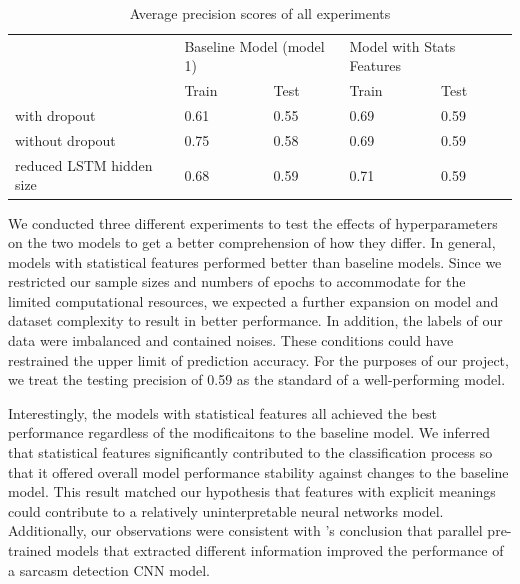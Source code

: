 \documentclass[12pt]{diazessay} %
\begin{document}
\begin{table}[h!]
    \centering
    \begin{tabular}{|l|l|l|l|l|}
    \hline
    \multirow{2}{*}{}        & \multicolumn{2}{l|}{Baseline Model (model 1)} & \multicolumn{2}{l|}{Model with Stats Features} \\ \cline{2-5} 
                             & Train                  & Test                 & Train                  & Test                  \\ \hline
    with dropout             & 0.61                   & 0.55                 & 0.69                   & 0.59                  \\ \hline
    without dropout          & 0.75                   & 0.58                 & 0.69                   & 0.59                  \\ \hline
    reduced LSTM hidden size & 0.68                   & 0.59                 & 0.71                   & 0.59                  \\ \hline
    \end{tabular}
    \caption{Average precision scores of all experiments}
    \label{table:AP}
\end{table}

We conducted three different experiments to test the effects of hyperparameters on the two models to get a better comprehension of how they differ. In general, models with statistical features performed better than baseline models. Since we restricted our sample sizes and numbers of epochs to accommodate for the limited computational resources, we expected a further expansion on model and dataset complexity to result in better performance. In addition, the labels of our data were imbalanced and contained noises. These conditions could have restrained the upper limit of prediction accuracy. For the purposes of our project, we treat the testing precision of 0.59 as the standard of a well-performing model. 

Interestingly, the models with statistical features all achieved the best performance regardless of the modificaitons to the baseline model. We inferred that statistical features significantly contributed to the classification process so that it offered overall model performance stability against changes to the baseline model. This result matched our hypothesis that features with explicit meanings could contribute to a relatively uninterpretable neural networks model. Additionally, our observations were consistent with \citet{poria2017}'s conclusion that parallel pre-trained models that extracted different information improved the performance of a sarcasm detection CNN model. 
\end{document}
